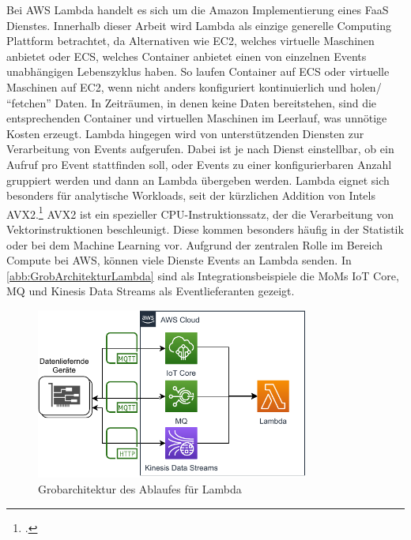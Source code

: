Bei \ac{AWS} Lambda handelt es sich um die Amazon Implementierung eines \ac{FaaS} Dienstes. Innerhalb dieser Arbeit wird Lambda als einzige generelle Computing Plattform betrachtet, da Alternativen wie \ac{EC2}, welches virtuelle Maschinen anbietet oder \ac{ECS}, welches Container anbietet einen von einzelnen Events unabhängigen Lebenszyklus haben. 
So laufen Container auf \ac{ECS} oder virtuelle Maschinen auf \ac{EC2}, wenn nicht anders konfiguriert kontinuierlich und holen/ \enquote{fetchen} Daten. In Zeiträumen, in denen keine Daten bereitstehen, sind die entsprechenden Container und virtuellen Maschinen im Leerlauf, was unnötige Kosten erzeugt. Lambda hingegen wird von unterstützenden Diensten zur Verarbeitung von Events aufgerufen. 
Dabei ist je nach Dienst einstellbar, ob ein Aufruf pro Event stattfinden soll, oder Events zu einer konfigurierbaren Anzahl gruppiert werden und dann an Lambda übergeben werden. Lambda eignet sich besonders für analytische Workloads, seit der kürzlichen Addition von Intels \ac{AVX2}.\footcite[Vgl. auch im Folgenden][]{Beswick.24.11.2020} \ac{AVX2} ist ein spezieller CPU-Instruktionssatz, der die Verarbeitung von Vektorinstruktionen beschleunigt. Diese kommen besonders häufig in der Statistik oder bei dem Machine Learning vor. 
Aufgrund der zentralen Rolle im Bereich Compute bei \ac{AWS}, können viele Dienste Events an Lambda senden. In \autoref{abb:GrobArchitekturLambda} sind als Integrationsbeispiele die \acp{MoM} \ac{IoT} Core, MQ und Kinesis Data Streams als Eventlieferanten gezeigt.
\begin{figure}[H]
\centering
\includegraphics[width=0.8\textwidth]{graphics/Lambda-general.pdf}
\caption{Grobarchitektur des Ablaufes für Lambda}
\label{abb:GrobArchitekturLambda}
\end{figure}

